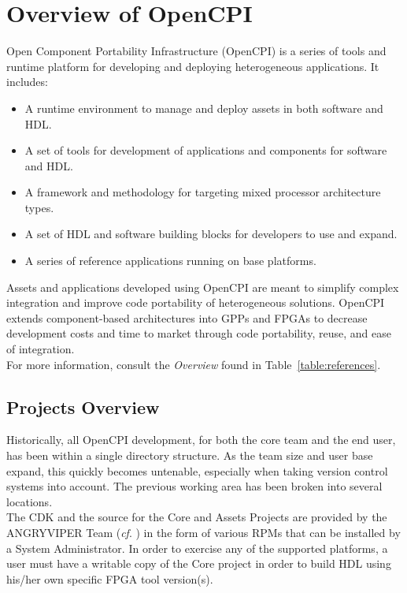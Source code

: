 \newpage
\section{Overview of OpenCPI}
Open Component Portability Infrastructure (OpenCPI) is a series of tools and runtime platform for developing and deploying heterogeneous applications.
It includes:
\begin{itemize}
\item A runtime environment to manage and deploy assets in both software and HDL.
\item A set of tools for development of applications and components for software and HDL.
\item A framework and methodology for targeting mixed processor architecture types.
\item A set of HDL and software building blocks for developers to use and expand.
\item A series of reference applications running on base platforms.
\end{itemize}

Assets and applications developed using OpenCPI are meant to simplify complex integration and improve code portability of heterogeneous solutions.
OpenCPI extends component-based architectures into GPPs and FPGAs to decrease development costs and time to market through code portability, reuse, and ease of integration.\\

For more information, consult the \textit{Overview} found in Table~\ref{table:references}.

\subsection{Projects Overview}
Historically, all OpenCPI development, for both the core team and the end user, has been within a single directory structure. As the team size and user base expand, this quickly becomes untenable, especially when taking version control systems into account. The previous working area has been broken into several locations. \\

The CDK and the source for the Core and Assets Projects are provided by the ANGRYVIPER Team (\textit{cf}. ) in the form of various RPMs that can be installed by a System Administrator.
In order to exercise any of the supported platforms, a user must have a writable copy of the Core project in order to build HDL using his/her own specific FPGA tool version(s).

